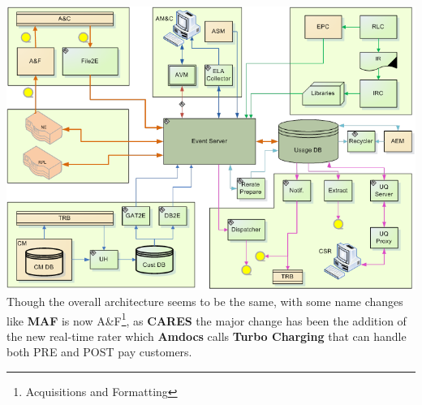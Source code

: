 \documentclass[12pt,twoside]{article}
\begin{document}
  \includegraphics[width=17.5cm]{Pictures/TC.png}
  Though the overall architecture seems to be the same, with some name changes like \textbf{MAF} is now A\&F\footnote{Acquisitions and Formatting
 }, as \textbf{CARES} the major change has been the addition of the new real-time rater which \textbf{Amdocs} calls \textbf{Turbo Charging} that can handle both PRE and POST pay customers.\\
\end{document}
